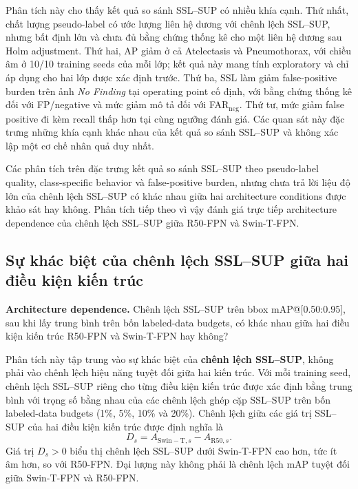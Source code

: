 \documentclass[pdflatex,sn-mathphys-num]{sn-jnl}%
\theoremstyle{thmstyleone}%
\theoremstyle{thmstyletwo}%
\theoremstyle{thmstylethree}%
\begin{document}
Phân tích này cho thấy kết quả so sánh SSL--SUP có nhiều khía cạnh. Thứ nhất, chất lượng pseudo-label có ước lượng liên hệ dương với chênh lệch SSL--SUP, nhưng bất định lớn và chưa đủ bằng chứng thống kê cho một liên hệ dương sau Holm adjustment. Thứ hai, AP giảm ở cả Atelectasis và Pneumothorax, với chiều âm ở 10/10 training seeds của mỗi lớp; kết quả này mang tính exploratory và chỉ áp dụng cho hai lớp được xác định trước. Thứ ba, SSL làm giảm false-positive burden trên ảnh \textit{No Finding} tại operating point cố định, với bằng chứng thống kê đối với FP/negative và mức giảm mô tả đối với FAR$_{\mathrm{neg}}$. Thứ tư, mức giảm false positive đi kèm recall thấp hơn tại cùng ngưỡng đánh giá. Các quan sát này đặc trưng những khía cạnh khác nhau của kết quả so sánh SSL--SUP và không xác lập một cơ chế nhân quả duy nhất.

Các phân tích trên đặc trưng kết quả so sánh SSL--SUP theo pseudo-label quality,
class-specific behavior và false-positive burden, nhưng chưa trả lời liệu độ
lớn của chênh lệch SSL--SUP có khác nhau giữa hai architecture conditions được khảo sát
hay không. Phân tích tiếp theo vì vậy đánh giá trực tiếp architecture
dependence của chênh lệch SSL--SUP giữa R50-FPN và Swin-T-FPN.

\subsection{Sự khác biệt của chênh lệch SSL--SUP giữa hai điều kiện kiến trúc}
\label{sec:results_sq3}

\textbf{Architecture dependence.} Chênh lệch SSL--SUP trên bbox mAP@[0.50:0.95], sau khi lấy trung bình trên bốn labeled-data budgets, có khác nhau giữa hai điều kiện kiến trúc R50-FPN và Swin-T-FPN hay không?

Phân tích này tập trung vào sự khác biệt của \textbf{chênh lệch SSL--SUP}, không phải vào chênh lệch hiệu năng tuyệt đối giữa hai kiến trúc. Với mỗi training seed, chênh lệch SSL--SUP riêng cho từng điều kiện kiến trúc được xác định bằng trung bình với trọng số bằng nhau của các chênh lệch ghép cặp SSL--SUP trên bốn labeled-data budgets (1\%, 5\%, 10\% và 20\%). Chênh lệch giữa các giá trị SSL--SUP của hai điều kiện kiến trúc được định nghĩa là
\begin{equation}
D_s=A_{\mathrm{Swin-T},s}-A_{\mathrm{R50},s}.
\label{eq:results_architecture_difference}
\end{equation}
Giá trị $D_s>0$ biểu thị chênh lệch SSL--SUP dưới Swin-T-FPN cao hơn, tức ít âm hơn, so với R50-FPN. Đại lượng này không phải là chênh lệch mAP tuyệt đối giữa Swin-T-FPN và R50-FPN.
\end{document}
